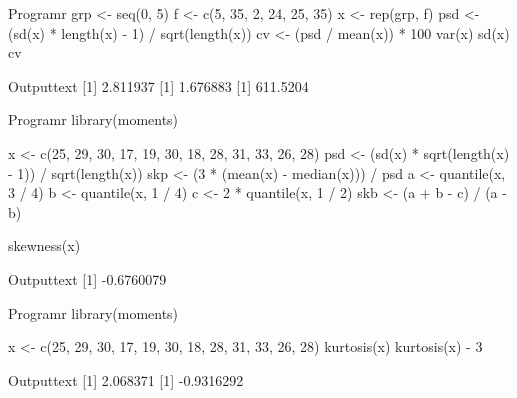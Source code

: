 \begin{code}
    {Program}{r}
grp <- seq(0, 5)
f <- c(5, 35, 2, 24, 25, 35)
x <- rep(grp, f)
psd <- (sd(x) * length(x) - 1) / sqrt(length(x))
cv <- (psd / mean(x)) * 100
var(x)
sd(x)
cv
\end{code}
\begin{code}
    {Output}{text}
[1] 2.811937
[1] 1.676883
[1] 611.5204
\end{code}
\newpage

\begin{code}
    {Program}{r}
library(moments)

x <- c(25, 29, 30, 17, 19, 30, 18, 28, 31, 33, 26, 28)
psd <- (sd(x) * sqrt(length(x) - 1)) / sqrt(length(x))
skp <- (3 * (mean(x) - median(x))) / psd
a <- quantile(x, 3 / 4)
b <- quantile(x, 1 / 4)
c <- 2 * quantile(x, 1 / 2)
skb <- (a + b - c) / (a - b)

skewness(x)
\end{code}
\begin{code}
    {Output}{text}
[1] -0.6760079
\end{code}

\begin{code}
    {Program}{r}
library(moments)

x <- c(25, 29, 30, 17, 19, 30, 18, 28, 31, 33, 26, 28)
kurtosis(x)
kurtosis(x) - 3
\end{code}
\begin{code}
    {Output}{text}
[1] 2.068371
[1] -0.9316292
\end{code}
